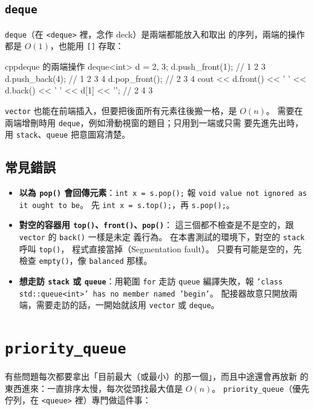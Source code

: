 \subsection{\texttt{deque}}

\texttt{deque}（在 \texttt{<deque>} 裡，念作 deck）是兩端都能放入和取出
的序列，兩端的操作都是 $O(1)$，也能用 \texttt{[]} 存取：

\begin{code}{cpp}{deque 的兩端操作}
deque<int> d = {2, 3};
d.push_front(1);           // 1 2 3
d.push_back(4);            // 1 2 3 4
d.pop_front();             // 2 3 4
cout << d.front() << ' ' << d.back() << ' ' << d[1] << '\n';   // 2 4 3
\end{code}

\texttt{vector} 也能在前端插入，但要把後面所有元素往後搬一格，是 $O(n)$。
需要在兩端增刪時用 \texttt{deque}，例如滑動視窗的題目；只用到一端或只需
要先進先出時，用 \texttt{stack}、\texttt{queue} 把意圖寫清楚。

\subsection{常見錯誤}

\begin{itemize}
\item \textbf{以為 \texttt{pop()} 會回傳元素}：\texttt{int x = s.pop();}
報 \texttt{void value not ignored as it ought to be}。 先
\texttt{int x = s.top();}，再 \texttt{s.pop();}。
\item \textbf{對空的容器用 \texttt{top()}、\texttt{front()}、\texttt{pop()}}：
這三個都不檢查是不是空的，跟 \texttt{vector} 的 \texttt{back()} 一樣是未定
義行為。 在本書測試的環境下，對空的 \texttt{stack} 呼叫 \texttt{top()}，
程式直接當掉（Segmentation fault）。 只要有可能是空的，先檢查
\texttt{empty()}，像 \texttt{balanced} 那樣。
\item \textbf{想走訪 \texttt{stack} 或 \texttt{queue}}：用範圍 \texttt{for}
走訪 \texttt{queue} 編譯失敗，報 \texttt{'class std::queue<int>' has no member named
'begin'}。 配接器故意只開放兩端，需要走訪的話，一開始就該用
\texttt{vector} 或 \texttt{deque}。
\end{itemize}

\section{\texttt{priority\_queue}}
\label{sec:pq}

有些問題每次都要拿出「目前最大（或最小）的那一個」，而且中途還會再放新
的東西進來：一直排序太慢，每次從頭找最大值是 $O(n)$。
\texttt{priority\_queue}（優先佇列，在 \texttt{<queue>} 裡）專門做這件事：

